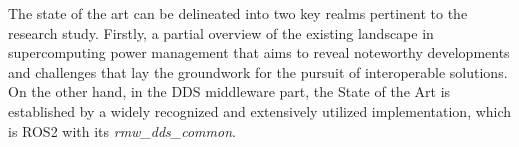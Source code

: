 

The state of the art can be delineated into two key realms pertinent to the research study. Firstly, a partial overview of the existing landscape in supercomputing power management that aims to reveal noteworthy developments and challenges that lay the groundwork for the pursuit of interoperable solutions. On the other hand, in the DDS middleware part, the State of the Art is established by a widely recognized and extensively utilized implementation, which is ROS2 with its \emph{rmw\_dds\_common}.

